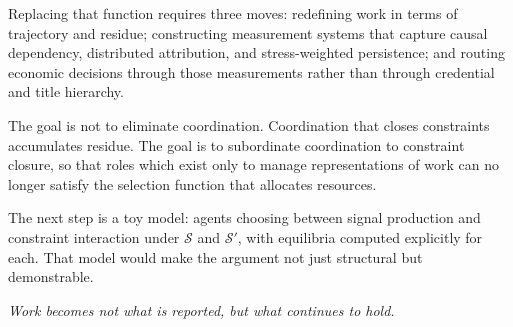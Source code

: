 \documentclass[12pt]{article}
\begin{document}
Replacing that function requires three moves: redefining work in terms
of trajectory and residue; constructing measurement systems that capture
causal dependency, distributed attribution, and stress-weighted
persistence; and routing economic decisions through those measurements
rather than through credential and title hierarchy.

The goal is not to eliminate coordination. Coordination that closes
constraints accumulates residue. The goal is to subordinate coordination
to constraint closure, so that roles which exist only to manage
representations of work can no longer satisfy the selection function
that allocates resources.

\medskip
\noindent The next step is a toy model: agents choosing between signal
production and constraint interaction under $\mathcal{S}$ and
$\mathcal{S}'$, with equilibria computed explicitly for each. That model
would make the argument not just structural but demonstrable.

\medskip
\begin{center}
\textit{Work becomes not what is reported, but what continues to hold.}
\end{center}
\end{document}

